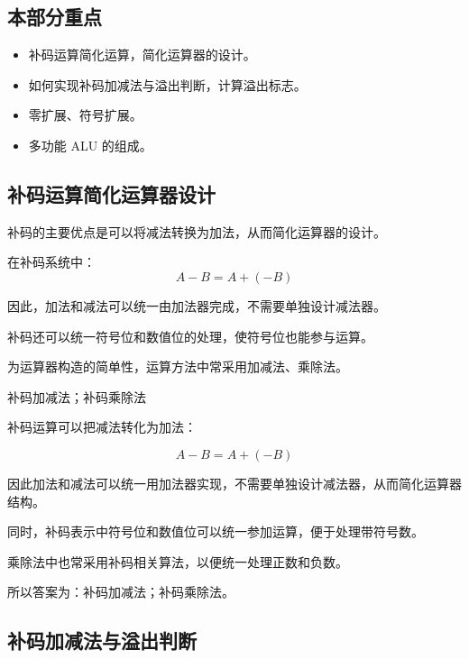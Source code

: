 \subsection*{本部分重点}
\begin{itemize}
    \item 补码运算简化运算，简化运算器的设计。
    \item 如何实现补码加减法与溢出判断，计算溢出标志。
    \item 零扩展、符号扩展。
    \item 多功能 ALU 的组成。
\end{itemize}

\subsection{补码运算简化运算器设计}

\begin{knowledge}
补码的主要优点是可以将减法转换为加法，从而简化运算器的设计。

在补码系统中：
\[
A - B = A + (-B)
\]

因此，加法和减法可以统一由加法器完成，不需要单独设计减法器。

补码还可以统一符号位和数值位的处理，使符号位也能参与运算。
\end{knowledge}


\begin{question}
为运算器构造的简单性，运算方法中常采用\underline{\hspace{2cm}}加减法、\underline{\hspace{2cm}}乘除法。
\end{question}

\begin{answer}
补码加减法；补码乘除法
\end{answer}

\begin{analysisenv}
补码运算可以把减法转化为加法：

\[
A - B = A + (-B)
\]

因此加法和减法可以统一用加法器实现，不需要单独设计减法器，从而简化运算器结构。

同时，补码表示中符号位和数值位可以统一参加运算，便于处理带符号数。

乘除法中也常采用补码相关算法，以便统一处理正数和负数。

所以答案为：补码加减法；补码乘除法。
\end{analysisenv}


\subsection{补码加减法与溢出判断}


